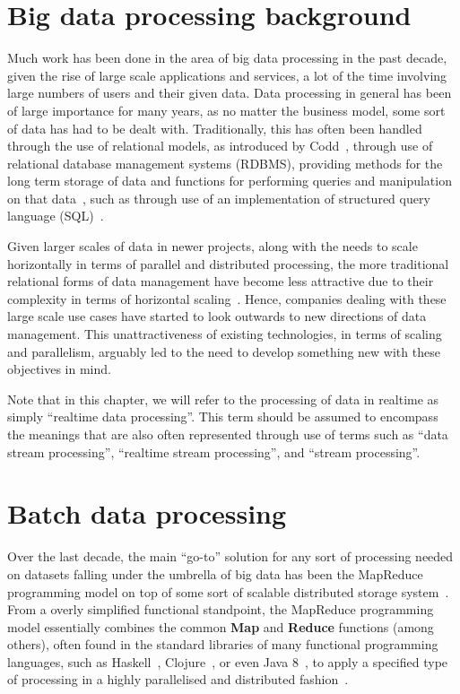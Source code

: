 

\section{Big data processing background} %
\label{sec:big_data_processing_background}

Much work has been done in the area of big data processing in the past decade, given the rise of large
scale applications and services, a lot of the time involving large numbers of users and their given data.
Data processing in general has been of large importance for many years, as no matter the business model,
some sort of data has had to be dealt with. Traditionally, this has often been handled through the use of
relational models, as introduced by Codd~\cite{codd1970relational}, through use of relational database
management systems (RDBMS), providing methods for the long term storage of
data and functions for performing queries and manipulation on that data~\cite{astrahan1976system},
such as through use of an implementation of structured query language (SQL)~\cite{chamberlin1974sequel}.

Given larger scales of data in newer projects, along with the needs to scale horizontally in terms of
parallel and distributed processing, the more traditional relational forms of data management have become
less attractive due to their complexity in terms of horizontal scaling~\cite{agrawal2011big}. Hence,
companies dealing with these large scale use cases have started to look outwards to new directions of
data management. This unattractiveness of existing technologies, in terms of scaling and parallelism,
arguably led to the need to develop something new with these objectives in mind.

Note that in this chapter, we will refer to the processing of data in realtime as simply ``realtime data
processing''. This term should be assumed to encompass the meanings that are also often represented through
use of terms such as ``data stream processing'', ``realtime stream processing'', and ``stream processing''.


\section{Batch data processing} %
\label{sub:batch_data_processing}

Over the last decade, the main ``go-to'' solution for any sort of processing needed on datasets falling under
the umbrella of big data has been the MapReduce programming model on top of some sort of scalable distributed
storage system~\cite{bifet_mining_2013}. From a overly simplified functional standpoint, the MapReduce
programming model essentially combines the common \textbf{Map} and \textbf{Reduce} functions (among others),
often found in the standard libraries of many functional programming languages, such as
Haskell~\cite{lammel2008google}, Clojure~\cite{hickey2008clojure}, or even Java 8~\cite{su2014changing}, to
apply a specified type of processing in a highly parallelised and distributed fashion~\cite{yang2007map}.

